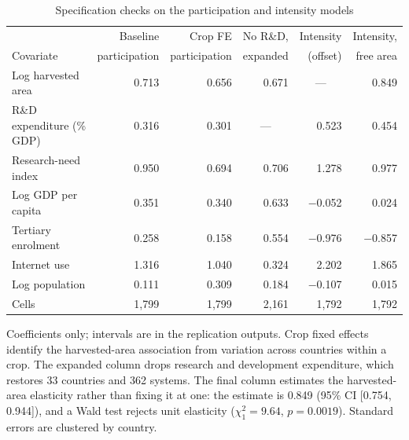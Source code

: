 \documentclass[ASNA,twocolumn]{USG}
\begin{document}
\begin{table}[t]
\centering
\footnotesize
\caption{Specification checks on the participation and intensity models}
\label{tab:specchecks}
\begin{tabular*}{\textwidth}{@{\extracolsep\fill}l r r r r r@{}}
\toprule
& Baseline & Crop FE & No R\&D, & Intensity & Intensity, \\
Covariate & participation & participation & expanded & (offset) & free area \\
\midrule
Log harvested area & 0.713 & 0.656 & 0.671 & \multicolumn{1}{c}{---} & 0.849 \\
R\&D expenditure (\% GDP) & 0.316 & 0.301 & \multicolumn{1}{c}{---} & 0.523 & 0.454 \\
Research-need index & 0.950 & 0.694 & 0.706 & 1.278 & 0.977 \\
Log GDP per capita & 0.351 & 0.340 & 0.633 & $-$0.052 & 0.024 \\
Tertiary enrolment & 0.258 & 0.158 & 0.554 & $-$0.976 & $-$0.857 \\
Internet use & 1.316 & 1.040 & 0.324 & 2.202 & 1.865 \\
Log population & 0.111 & 0.309 & 0.184 & $-$0.107 & 0.015 \\
\midrule
Cells & 1,799 & 1,799 & 2,161 & 1,792 & 1,792 \\
\bottomrule
\end{tabular*}
\begin{tablenotes}
\item[] Coefficients only; intervals are in the replication outputs. Crop fixed effects identify the harvested-area association from variation across countries within a crop. The expanded column drops research and development expenditure, which restores 33 countries and 362 systems. The final column estimates the harvested-area elasticity rather than fixing it at one: the estimate is 0.849 (95\% CI [0.754, 0.944]), and a Wald test rejects unit elasticity ($\chi^2_1 = 9.64$, $p = 0.0019$). Standard errors are clustered by country.
\end{tablenotes}
\end{table}
\end{document}
